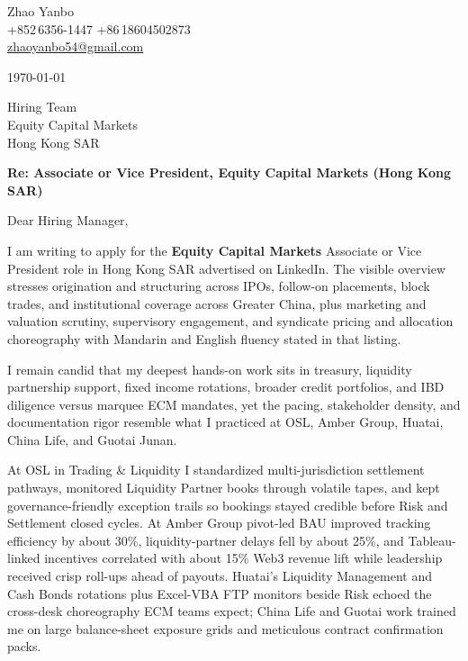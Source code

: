 \documentclass[10pt,a4paper]{article}
\begin{document}
\begin{flushleft}
  Zhao Yanbo\\
  +852\,6356-1447 \;\textbar\; +86\,18604502873\\
  \href{mailto:zhaoyanbo54@gmail.com}{zhaoyanbo54@gmail.com}
\end{flushleft}

\vspace{1em}

\begin{flushright}
  \today
\end{flushright}

\vspace{0.75em}

Hiring Team\\
Equity Capital Markets\\
Hong Kong SAR

\vspace{1em}

\textbf{Re: Associate or Vice President, Equity Capital Markets (Hong Kong SAR)}

\vspace{0.75em}

Dear Hiring Manager,

I am writing to apply for the \textbf{Equity Capital Markets} Associate or Vice President role in Hong Kong SAR advertised on LinkedIn. The visible overview stresses origination and structuring across IPOs, follow-on placements, block trades, and institutional coverage across Greater China, plus marketing and valuation scrutiny, supervisory engagement, and syndicate pricing and allocation choreography with Mandarin and English fluency stated in that listing.

I remain candid that my deepest hands-on work sits in treasury, liquidity partnership support, fixed income rotations, broader credit portfolios, and IBD diligence versus marquee ECM mandates, yet the pacing, stakeholder density, and documentation rigor resemble what I practiced at OSL, Amber Group, Huatai, China Life, and Guotai Junan.

At OSL in Trading \& Liquidity I standardized multi-jurisdiction settlement pathways, monitored Liquidity Partner books through volatile tapes, and kept governance-friendly exception trails so bookings stayed credible before Risk and Settlement closed cycles. At Amber Group pivot-led BAU improved tracking efficiency by about 30\%, liquidity-partner delays fell by about 25\%, and Tableau-linked incentives correlated with about 15\% Web3 revenue lift while leadership received crisp roll-ups ahead of payouts. Huatai's Liquidity Management and Cash Bonds rotations plus Excel-VBA FTP monitors beside Risk echoed the cross-desk choreography ECM teams expect; China Life and Guotai work trained me on large balance-sheet exposure grids and meticulous contract confirmation packs.
\end{document}
